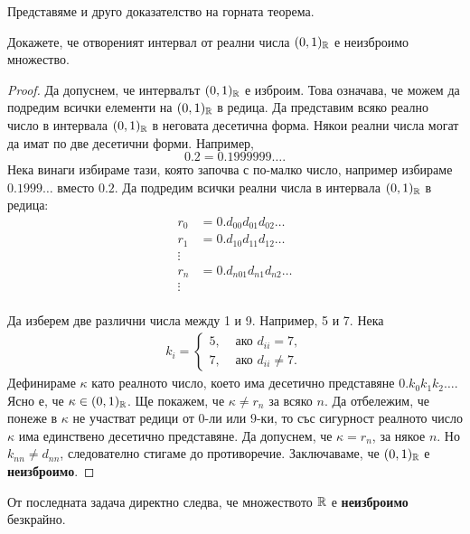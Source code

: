 Представяме и друго доказателство на горната теорема.
\begin{problem}
  Докажете, че отвореният интервал от реални числа $(0,1)_{\mathbb{R}}$ е неизброимо множество.
\end{problem}
\begin{proof}
  Да допуснем, че интервалът $(0,1)_{\mathbb{R}}$ е изброим. Това означава, че можем да подредим всички елементи на $(0,1)_{\mathbb{R}}$ в редица.
  Да представим всяко реално число в интервала $(0,1)_{\mathbb{R}}$ в неговата десетична форма.
  Някои реални числа могат да имат по две десетични форми.
  Например, 
  \[0.2 = 0.1999999\dots.\]
  Нека винаги избираме тази, която започва с по-малко число, например избираме $0.1999\dots$ вместо $0.2$.
  Да подредим всички реални числа в интервала $(0,1)_{\mathbb{R}}$ в редица:
  \begin{align*}
    r_0 & = 0.d_{00}d_{01}d_{02}\dots\\
    r_1 & = 0.d_{10}d_{11}d_{12}\dots\\
    \vdots\\
    r_n & = 0.d_{n01}d_{n1}d_{n2}\dots\\
    \vdots\\
  \end{align*}

  Да изберем две различни числа между 1 и 9. Например, 5 и 7.
  Нека 
  \begin{align*}
    k_i = 
    \begin{cases}
      5, & \mbox{ ако } d_{ii} = 7,\\
      7, & \mbox{ ако } d_{ii} \neq 7.
    \end{cases}
  \end{align*}
  Дефинираме $\kappa$ като реалното число, което има десетично представяне $0.k_0k_1k_2\dots$.
  Ясно е, че $\kappa \in (0,1)_{\mathbb{R}}$. Ще покажем, че $\kappa \neq r_n$ за всяко $n$.
  Да отбележим, че понеже в $\kappa$ не участват редици от $0$-ли или $9$-ки, то със сигурност 
  реалното число $\kappa$ има единствено десетично представяне.
  Да допуснем, че $\kappa = r_n$, за някое $n$.
  Но $k_{nn} \neq d_{nn}$, следователно стигаме до противоречие.
  Заключаваме, че $(0,1)_{\mathbb{R}}$ е {\bf неизброимо}.
\end{proof}

\begin{remark}
  От последната задача директно следва, че множеството $\mathbb{R}$ е {\bf неизброимо} безкрайно.
\end{remark}


